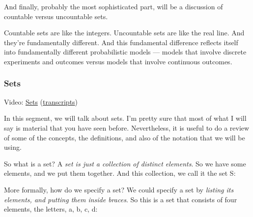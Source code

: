 \documentclass[pdftex, brazil, 12pt, twoside]{article}
\begin{document}
And finally, probably the most sophisticated part, will be a
discussion of countable versus uncountable sets.

Countable sets are like the integers.
Uncountable sets are like the real line.
And they're fundamentally different.
And this fundamental difference reflects itself
into fundamentally different probabilistic models ---
models that involve discrete experiments and outcomes
versus models that involve continuous outcomes.

\subsubsection{Sets}
\label{un1-math-back-sets}

Video: \href{https://www.youtube.com/watch?v=ZAZNrW992Fc}{Sets}
(\href{Unit-1/02\_mathematical\_background/mb\_2\_transcripts.pdf}{transcripts})

In this segment, we will talk about sets.
I'm pretty sure that most of what I will say is material
that you have seen before.
Nevertheless, it is useful to do a review of some of the
concepts, the definitions, and also of the notation that we
will be using.

So what is a set?
A \emph{set is just a collection of distinct elements}.
So we have some elements, and we put them together.
And this collection, we call it the set S:

\begin{figure}[H]
  \begin{center}
  \end{center}
\end{figure}

More formally, how do we specify a set?
We could specify a set by \emph{listing its elements, and
putting them inside braces}.
So this is a set that consists of four elements, the letters,
a, b, c, d:

\begin{figure}[H]
  \begin{center}
  \end{center}
\end{figure}
\end{document}
